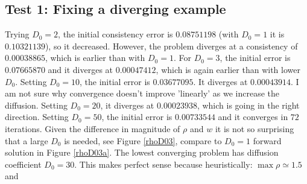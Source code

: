 \documentclass[11pt, a4paper]{article}
\theoremstyle{definition}
\begin{document}
\subsection{Test 1: Fixing a diverging example}
Trying $D_0= 2$, the initial consistency error is $0.08751198$ (with $D_0 = 1$ it is $0.10321139$), so it decreased. However, the problem diverges at a consistency of $0.00038865$, which is earlier than with $D_0=1$. For $D_0=3$, the initial error is $0.07665870$ and it diverges at $0.00047412$, which is again earlier than with lower $D_0$. 
Setting $D_0 = 10$, the initial error is $0.03677095$. It diverges at $0.00043914$. I am not sure why convergence doesn't improve 'linearly' as we increase the diffusion.
Setting $D_0 = 20$, it diverges at $0.00023938$, which is going in the right direction.
Setting $D_0 = 50$, the initial error is $0.00733544$ and it converges in $72$ iterations. Given the difference in magnitude of $\rho$ and $w$ it is not so surprising that a large $D_0$ is needed, see Figure \ref{rhoD03}, compare to $D_0 = 1$ forward solution in Figure \ref{rhoD03a}. The lowest converging problem has diffusion coefficient $D_0 = 30$. This makes perfect sense because heuristically:
$\max \rho \simeq 1.5$ and 
\end{document}

